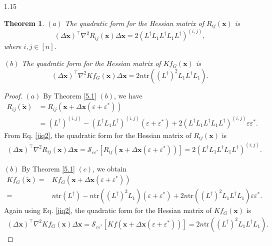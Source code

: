 \documentclass[preprint,12pt]{elsarticle1}
\newtheorem{thm}{Theorem}[section]
\numberwithin{equation}{section}
\begin{document}
\begin{spacing}{1.15}
\begin{thm}
$(a)$ The quadratic form for the Hessian matrix  of $R_{ij}(\mathbf{x})$ is $$(\Delta \mathbf{x})^{\top} \nabla^{2} R_{ij}(\mathbf{x})\Delta \mathbf{\mathbf{x}}=2(L^{\dag}L_{1}L^{\dag}L_{1}L^{\dag})^{(i,j)},$$
where $i,j\in[n]$.

$(b)$  The quadratic form for the Hessian matrix  of $Kf_{G}(\mathbf{x})$ is
$$(\Delta \mathbf{x})^{\top} \nabla^{2} Kf_{G}(\mathbf{x})\Delta \mathbf{x}= 2n \mathrm{tr}((L^\dag)^{2} L_{1} L^\dag L_{1}).$$
\end{thm}
\begin{proof}
 $(a)$ By Theorem \ref{5.1} $(b)$, we have
\begin{align}\nonumber R_{ij}(\widetilde{\mathbf{x}})&=R_{ij}(\textbf{x} +\Delta \textbf{x}(\varepsilon+\varepsilon^{*}))\\ \nonumber
&=(L^{\dag})^{(i,j)}-
(L^{\dag}L_{1}L^{\dag})^{(i,j)}(\varepsilon
+\varepsilon^{*})
+2(L^{\dag}L_{1}L^{\dag}L_{1}L^{\dag})^{(i,j)}
\varepsilon\varepsilon^{*}.
\end{align}
From Eq. \eqref{jiq2},  the quadratic form for the Hessian matrix  of $R_{ij}(\mathbf{x})$ is
\begin{align}\nonumber
(\Delta \textbf{x})^{\top}\nabla^{2}R_{ij}(\mathbf{x})\Delta \textbf{x}=\mathcal{S}_{\varepsilon\varepsilon^{*}}[R_{ij}(\textbf{x} +\Delta \textbf{x}(\varepsilon+\varepsilon^{*}))]=2(L^{\dag}L_{1}L^{\dag}L_{1}L^{\dag})^{(i,j)}.\end{align}


$(b)$ By Theorem \ref{5.1} $(c)$, we obtain
\begin{align*}
Kf_{G}(\widetilde{\textbf{x}})=& Kf_{G}(\mathbf{x} + \Delta \mathbf{x}(\varepsilon + \varepsilon^{*}))\\
=&n\textrm{tr}(L^{\dag})
-n\textrm{tr}((L^{\dag})^{2}L_{1})
(\varepsilon+\varepsilon^{*})
+2n\textrm{tr}((L^{\dag})^{2}L_{1}L^{\dag}L_{1})
\varepsilon\varepsilon^{*}.
\end{align*}
Again using Eq. \eqref{jiq2},
the quadratic form for the Hessian matrix  of $Kf_{G}(\textbf{x})$ is
\begin{align}\nonumber
(\Delta \textbf{x})^{\top}\nabla^2 Kf_{G}(\textbf{x})\Delta \textbf{x}=\mathcal{S}_{\varepsilon\varepsilon^{*}}[Kf(\textbf{x} +\Delta \textbf{x}(\varepsilon+\varepsilon^{*}))]= 2n \textrm{tr}((L^\dag)^{2} L_{1} L^\dag L_{1}).
\end{align}


\end{proof}
\end{spacing}
\end{document}
